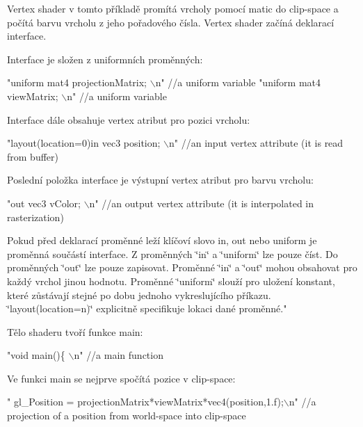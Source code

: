 Vertex shader v tomto příkladě promítá vrcholy pomocí matic do clip-\/space a počítá barvu vrcholu z jeho pořadového čísla. Vertex shader začíná deklarací interface.\par
 Interface je složen z uniformních proměnných\-: 
\begin{DoxyCodeInclude}
\textcolor{stringliteral}{"uniform mat4 projectionMatrix;                                 \(\backslash\)n"} \textcolor{comment}{//a uniform variable}
\textcolor{stringliteral}{"uniform mat4 viewMatrix;                                       \(\backslash\)n"} \textcolor{comment}{//a uniform variable}
\end{DoxyCodeInclude}
Interface dále obsahuje vertex atribut pro pozici vrcholu\-: 
\begin{DoxyCodeInclude}
\textcolor{stringliteral}{"layout(location=0)in vec3 position;                            \(\backslash\)n"} \textcolor{comment}{//an input vertex attribute (it is read
       from buffer)}
\end{DoxyCodeInclude}
Poslední položka interface je výstupní vertex atribut pro barvu vrcholu\-: 
\begin{DoxyCodeInclude}
\textcolor{stringliteral}{"out vec3 vColor;                                               \(\backslash\)n"} \textcolor{comment}{//an output vertex attribute (it is
       interpolated in rasterization)}
\end{DoxyCodeInclude}
Pokud před deklarací proměnné leží klíčoví slovo in, out nebo uniform je proměnná součástí interface. Z proměnných \char`\"{}in\char`\"{} a \char`\"{}uniform\char`\"{} lze pouze číst. Do proměnných \char`\"{}out\char`\"{} lze pouze zapisovat. Proměnné \char`\"{}in\char`\"{} a \char`\"{}out\char`\"{} mohou obsahovat pro každý vrchol jinou hodnotu. Proměnné \char`\"{}uniform\char`\"{} slouží pro uložení konstant, které zůstávají stejné po dobu jednoho vykreslujícího příkazu. \char`\"{}layout(location=n)\char`\"{} explicitně specifikuje lokaci dané proměnné."\par
 Tělo shaderu tvoří funkce main\-: 
\begin{DoxyCodeInclude}
\textcolor{stringliteral}{"void main()\{                                                   \(\backslash\)n"} \textcolor{comment}{//a main function}
\end{DoxyCodeInclude}
Ve funkci main se nejprve spočítá pozice v clip-\/space\-: 
\begin{DoxyCodeInclude}
\textcolor{stringliteral}{"  gl\_Position = projectionMatrix*viewMatrix*vec4(position,1.f);\(\backslash\)n"} \textcolor{comment}{//a projection of a position from
       world-space into clip-space}
\end{DoxyCodeInclude}
